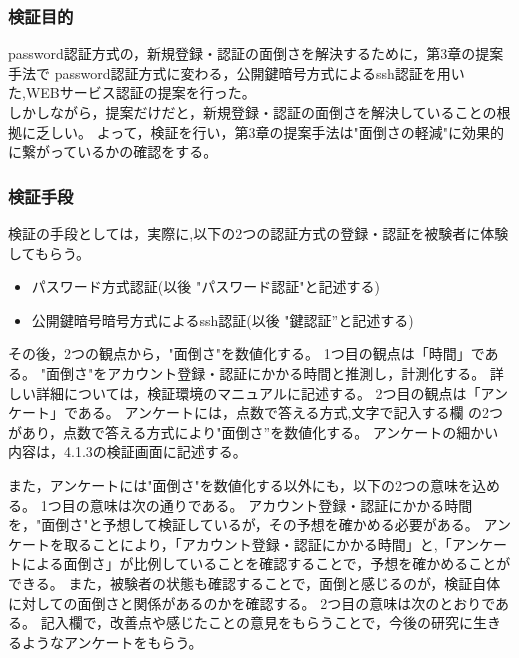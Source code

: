     \subsubsection{検証目的}
    password認証方式の，新規登録・認証の面倒さを解決するために，第3章の提案手法で
    password認証方式に変わる，公開鍵暗号方式によるssh認証を用いた,WEBサービス認証の提案を行った。\\
    しかしながら，提案だけだと，新規登録・認証の面倒さを解決していることの根拠に乏しい。
    よって，検証を行い，第3章の提案手法は"面倒さの軽減"に効果的に繋がっているかの確認をする。
    \subsubsection{検証手段} 
    検証の手段としては，実際に,以下の2つの認証方式の登録・認証を被験者に体験してもらう。

    \begin{itemize}
    \item パスワード方式認証(以後 "パスワード認証"と記述する)
    \item 公開鍵暗号暗号方式によるssh認証(以後 "鍵認証”と記述する)
    \end{itemize}

    その後，2つの観点から，"面倒さ"を数値化する。
    1つ目の観点は「時間」である。
    "面倒さ"をアカウント登録・認証にかかる時間と推測し，計測化する。
    詳しい詳細については，検証環境のマニュアルに記述する。
    2つ目の観点は「アンケート」である。
    アンケートには，点数で答える方式,文字で記入する欄 の2つがあり，点数で答える方式により"面倒さ”を数値化する。
    アンケートの細かい内容は，4.1.3の検証画面に記述する。

    また，アンケートには"面倒さ"を数値化する以外にも，以下の2つの意味を込める。
    1つ目の意味は次の通りである。
    アカウント登録・認証にかかる時間 を，"面倒さ"と予想して検証しているが，その予想を確かめる必要がある。
    アンケートを取ることにより，「アカウント登録・認証にかかる時間」と,「アンケートによる面倒さ」が比例していることを確認することで，予想を確かめることができる。
    また，被験者の状態も確認することで，面倒と感じるのが，検証自体に対しての面倒さと関係があるのかを確認する。
    2つ目の意味は次のとおりである。
    記入欄で，改善点や感じたことの意見をもらうことで，今後の研究に生きるようなアンケートをもらう。

